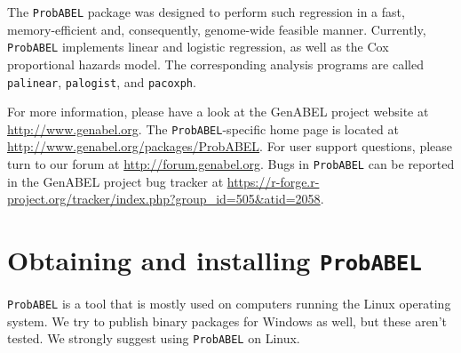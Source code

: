 \documentclass[12pt,a4paper]{article}
\newcommand{\PA}{\texttt{ProbABEL}}
\begin{document}
The \PA{} package was designed to perform such regression
in a fast, memory-efficient and, consequently, genome-wide feasible manner.
Currently, \PA{} implements linear and logistic regression,
as well as the Cox proportional hazards model. The corresponding analysis
programs are called \texttt{palinear},  \texttt{palogist},
and \texttt{pacoxph}.

For more information, please have a look at the GenABEL project
website at \url{http://www.genabel.org}. The \PA{}-specific home
page is located at
\url{http://www.genabel.org/packages/ProbABEL}. For user support
questions, please turn to our forum at
\url{http://forum.genabel.org}. Bugs in \PA{} can be reported in the
GenABEL project bug tracker at
\url{https://r-forge.r-project.org/tracker/index.php?group_id=505&atid=2058}.

\section{Obtaining and installing \PA}
\label{sec:obtaininstall}
\PA{} is a tool that is mostly used on computers running the Linux
operating system. We try to publish binary packages for Windows as
well, but these aren't tested. We strongly suggest using \PA{} on
Linux.
\end{document}
